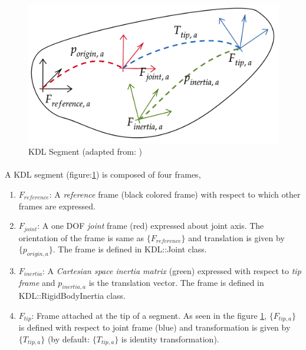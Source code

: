 \begin{figure}[h!]
	\begin{center}
		\includegraphics[scale=0.25]{images/segment}
	\end{center}
	\caption{KDL Segment (adapted from: \cite{kinematictreeKDL})}
	\label{fig:segment}
\end{figure} 

\paragraph{}A KDL segment (figure:\ref{fig:segment}) is composed of four frames,
\begin{enumerate}
	\item $F_{reference}$: A \textit{reference} frame (black colored frame) with respect to which other frames are expressed.
	\item $F_{joint}$: A one DOF \textit{joint} frame (red) expressed about joint axis. The orientation of the frame is same as $\{F_{reference}\}$ and translation is given by $\{p_{origin, a}\}$. The frame is defined in KDL::Joint class.
	\item $F_{inertia}$: A \textit{Cartesian space inertia matrix} (green) expressed with respect to \textit{tip frame} and $p_{inertia, a}$ is the translation vector. The frame is defined in KDL::RigidBodyInertia class.  
	\item $F_{tip}$: Frame attached at the tip of a segment. As seen in the figure \ref{fig:segment}, $\{F_{tip, a}\}$ is defined with respect to joint frame (blue) and transformation is given by $\{T_{tip, a}\}$ (by default: $\{T_{tip, a}\}$ is identity transformation). 
\end{enumerate}

